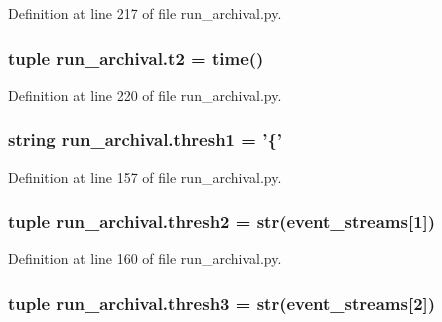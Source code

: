Definition at line 217 of file run\-\_\-archival.\-py.

\hypertarget{namespacerun__archival_a2179a933281124091cdc32bed8a04c7f}{
\subsubsection[{t2}]{\setlength{\rightskip}{0pt plus 5cm}tuple run\-\_\-archival.\-t2 = time()}}\label{namespacerun__archival_a2179a933281124091cdc32bed8a04c7f}


Definition at line 220 of file run\-\_\-archival.\-py.

\hypertarget{namespacerun__archival_a345979c5efe939df4bbf314d62511433}{
\subsubsection[{thresh1}]{\setlength{\rightskip}{0pt plus 5cm}string run\-\_\-archival.\-thresh1 = '\{'}}\label{namespacerun__archival_a345979c5efe939df4bbf314d62511433}


Definition at line 157 of file run\-\_\-archival.\-py.

\hypertarget{namespacerun__archival_aa0af2b82ec84c97c5e9a4cffcec972c3}{
\subsubsection[{thresh2}]{\setlength{\rightskip}{0pt plus 5cm}tuple run\-\_\-archival.\-thresh2 = str({\bf event\-\_\-streams}\mbox{[}1\mbox{]})}}\label{namespacerun__archival_aa0af2b82ec84c97c5e9a4cffcec972c3}


Definition at line 160 of file run\-\_\-archival.\-py.

\hypertarget{namespacerun__archival_a59a2df7dced0835b40b789af0ee70d18}{
\subsubsection[{thresh3}]{\setlength{\rightskip}{0pt plus 5cm}tuple run\-\_\-archival.\-thresh3 = str({\bf event\-\_\-streams}\mbox{[}2\mbox{]})}}\label{namespacerun__archival_a59a2df7dced0835b40b789af0ee70d18}


